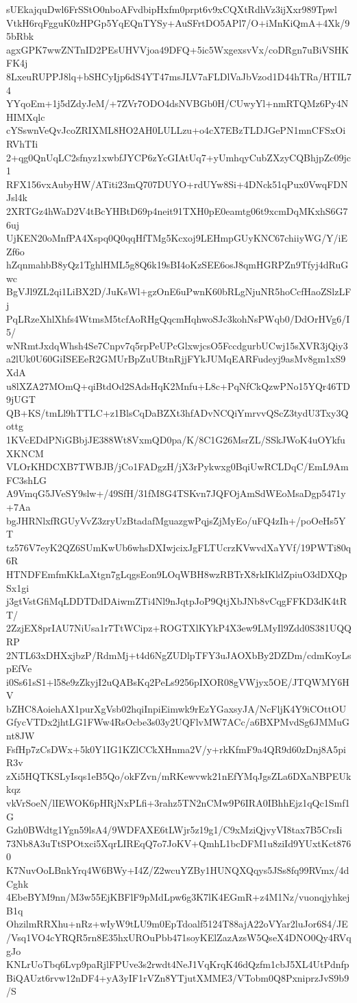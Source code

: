 sUEkajquDwl6FrSStO0nboAFvdbipHxfm0prpt6v9xCQXtRdhVz3ijXxr989Tpwl
VtkH6rqFgguK0zHPGp5YqEQnTYSy+AuSFrtDO5APl7/O+iMnKiQmA+4Xk/95bRbk
agxGPK7wwZNTnID2PEsUHVVjoa49DFQ+5ic5WxgexsvVx/coDRgn7uBiVSHKFK4j
8LxeuRUPPJ8lq+bSHCyIjp6dS4YT47msJLV7aFLDlVaJbVzod1D44hTRa/HTIL74
YYqoEm+1j5dZdyJeM/+7ZVr7ODO4dsNVBGb0H/CUwyYl+nmRTQMz6Py4NHIMXqlc
cYSswnVeQvJcoZRIXML8HO2AH0LULLzu+o4cX7EBzTLDJGePN1mnCFSxOiRVhTIi
2+qg0QnUqLC2sfnyz1xwbfJYCP6zYcGIAtUq7+yUmhqyCubZXzyCQBhjpZc09jc1
RFX156vxAubyHW/ATiti23mQ707DUYO+rdUYw8Si+4DNck51qPux0VwqFDNJsl4k
2XRTGz4hWaD2V4tBcYHBtD69p4neit91TXH0pE0eamtg06t9xcmDqMKxhS6G76uj
UjKEN20oMnfPA4Xspq0Q0qqHfTMg5Kcxoj9LEHmpGUyKNC67chiiyWG/Y/iEZf6o
hZqnmahbB8yQz1TghlHML5g8Q6k19sBI4oKzSEE6osJ8qmHGRPZn9Tfyj4dRuGwc
BgVJl9ZL2qi1LiBX2D/JuKsWl+gzOnE6uPwnK60bRLgNjuNR5hoCcfHaoZSlzLFj
PqLRzeXhlXhfs4WtmsM5tcfAoRHgQqcmHqhwoSJc3kohNsPWqb0/DdOrHVg6/I5/
wNRmtJxdqWhsh4Se7Cnpv7q5rpPeUPcGlxwjcsO5FccdgurbUCwj15sXVR3jQiy3
a2lUk0U60GiISEEeR2GMUrBpZuUBtnRjjFYkJUMqEARFudeyj9asMv8gm1xS9XdA
u8lXZA27MOmQ+qiBtdOd2SAdsHqK2Mnfu+L8c+PqNfCkQzwPNo15YQr46TD9jUGT
QB+KS/tmLl9hTTLC+z1BlsCqDaBZXt3hfADvNCQiYmrvvQScZ3tydU3Txy3Qottg
1KVcEDdPNiGBbjJE388Wt8VxmQD0pa/K/8C1G26MsrZL/SSkJWoK4uOYkfuXKNCM
VLOrKHDCXB7TWBJB/jCo1FADgzH/jX3rPykwxg0BqiUwRCLDqC/EmL9AmFC3shLG
A9VmqG5JVeSY9slw+/49SfH/31fM8G4TSKvn7JQFOjAmSdWEoMsaDgp5471y+7Aa
bgJHRNlxfRGUyVvZ3zryUzBtadafMguazgwPqjsZjMyEo/uFQ4zIh+/poOeHs5YT
tz576V7eyK2QZ6SUmKwUb6whsDXIwjcixJgFLTUcrzKVwvdXaYVf/19PWTi80q6R
HTNDFEmfmKkLaXtgn7gLqgsEon9LOqWBH8wzRBTrX8rkIKldZpiuO3dDXQpSx1gi
j3gtVstGfiMqLDDTDdDAiwmZTi4Nl9nJqtpJoP9QtjXbJNb8vCqgFFKD3dK4tRT/
2ZzjEX8prIAU7NiUsa1r7TtWCipz+ROGTXlKYkP4X3ew9LMyIl9Zdd0S381UQQRP
2NTL63xDHXxjbzP/RdmMj+t4d6NgZUDlpTFY3uJAOXbBy2DZDm/cdmKoyLspEfVe
i0Ss61sS1+l58e9zZkyjI2uQABsKq2PeLs9256pIXOR08gVWjyx5OE/JTQWMY6HV
bZHC8AoiehAX1purXgVsb02hqiInpiEimwk9rEzYGaxsyJA/NcFljK4Y9iCOttOU
GfycVTDx2jhtLG1FWw4RsOcbe3s03y2UQFlvMW7ACc/a6BXPMvdSg6JMMuGnt8JW
FsfHp7zCsDWx+5k0Y1IG1KZlCCkXHnma2V/y+rkKfmF9a4QR9d60zDnj8A5piR3v
zXi5HQTKSLyIsqs1eB5Qo/okFZvn/mRKewvwk21nEfYMqJgsZLa6DXaNBPEUkkqz
vkVrSoeN/lIEWOK6pHRjNxPLfi+3rahz5TN2nCMw9P6IRA0IBhhEjz1qQc1Smf1G
Gzh0BWdtg1Ygn59lsA4/9WDFAXE6tLWjr5z19g1/C9xMziQjvyVI8tax7B5CrsIi
73Nb8A3uTtSPOtxci5XqrLIREqQ7o7JoKV+QmhL1bcDFM1u8ziId9YUxtKct8760
K7NuvOoLBnkYrq4W6BWy+I4Z/Z2wcuYZBy1HUNQXQqys5JSs8fq99RVmx/4dCghk
4EbeBYM9nn/M3w55EjKBFlF9pMdLpw6g3K7lK4EGmR+z4M1Nz/vuonqjyhkejB1q
OhzilmRRXhu+nRz+wIyW9tLU9m0EpTdoalf5124T88ajA22oVYar2luJor6S4/JE
/Vsq1VO4cYRQR5rn8E35hxUROuPbb471soyKElZazAzsW5QseX4DNO0Qy4RVqgJo
KNLrUoTbq6Lvp9paRjlFPUve3s2rwdt4NeJ1VqKrqK46dQzfm1cbJ5XL4UtPdnfp
BiQAUzt6rvw12nDF4+yA3yIF1rVZn8YTjutXMME3/VTobm0Q8PxniprzJvS9b9/S
